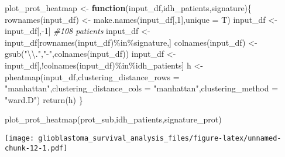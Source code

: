 \documentclass[
]{article}
\newenvironment{Shaded}{\begin{snugshade}}{\end{snugshade}}
\newcommand{\AttributeTok}[1]{\textcolor[rgb]{0.77,0.63,0.00}{#1}}
\newcommand{\CommentTok}[1]{\textcolor[rgb]{0.56,0.35,0.01}{\textit{#1}}}
\newcommand{\ControlFlowTok}[1]{\textcolor[rgb]{0.13,0.29,0.53}{\textbf{#1}}}
\newcommand{\DecValTok}[1]{\textcolor[rgb]{0.00,0.00,0.81}{#1}}
\newcommand{\FunctionTok}[1]{\textcolor[rgb]{0.00,0.00,0.00}{#1}}
\newcommand{\NormalTok}[1]{#1}
\newcommand{\OtherTok}[1]{\textcolor[rgb]{0.56,0.35,0.01}{#1}}
\newcommand{\SpecialCharTok}[1]{\textcolor[rgb]{0.00,0.00,0.00}{#1}}
\newcommand{\StringTok}[1]{\textcolor[rgb]{0.31,0.60,0.02}{#1}}
\begin{document}
\begin{Shaded}
\begin{Highlighting}[]
\NormalTok{plot\_prot\_heatmap }\OtherTok{\textless{}{-}} \ControlFlowTok{function}\NormalTok{(input\_df,idh\_patients,signature)\{}
  \FunctionTok{rownames}\NormalTok{(input\_df) }\OtherTok{\textless{}{-}} \FunctionTok{make.names}\NormalTok{(input\_df[,}\DecValTok{1}\NormalTok{],}\AttributeTok{unique =}\NormalTok{ T)}
\NormalTok{  input\_df }\OtherTok{\textless{}{-}}\NormalTok{ input\_df[,}\SpecialCharTok{{-}}\DecValTok{1}\NormalTok{] }\CommentTok{\#108 patients}
\NormalTok{  input\_df }\OtherTok{\textless{}{-}}\NormalTok{ input\_df[}\FunctionTok{rownames}\NormalTok{(input\_df)}\SpecialCharTok{\%in\%}\NormalTok{signature,]}
  \FunctionTok{colnames}\NormalTok{(input\_df) }\OtherTok{\textless{}{-}} \FunctionTok{gsub}\NormalTok{(}\StringTok{"}\SpecialCharTok{\textbackslash{}\textbackslash{}}\StringTok{."}\NormalTok{,}\StringTok{"{-}"}\NormalTok{,}\FunctionTok{colnames}\NormalTok{(input\_df))}
\NormalTok{  input\_df }\OtherTok{\textless{}{-}}\NormalTok{ input\_df[,}\SpecialCharTok{!}\FunctionTok{colnames}\NormalTok{(input\_df)}\SpecialCharTok{\%in\%}\NormalTok{idh\_patients]}
\NormalTok{  h }\OtherTok{\textless{}{-}} \FunctionTok{pheatmap}\NormalTok{(input\_df,}\AttributeTok{clustering\_distance\_rows =} \StringTok{"manhattan"}\NormalTok{,}\AttributeTok{clustering\_distance\_cols  =} \StringTok{"manhattan"}\NormalTok{,}\AttributeTok{clustering\_method =} \StringTok{"ward.D"}\NormalTok{)}
  \FunctionTok{return}\NormalTok{(h)}
\NormalTok{\}}
\end{Highlighting}
\end{Shaded}

\begin{Shaded}
\begin{Highlighting}[]
\FunctionTok{plot\_prot\_heatmap}\NormalTok{(prot\_sub,idh\_patients,signature\_prot)}
\end{Highlighting}
\end{Shaded}

\texttt{[image: glioblastoma\_survival\_analysis\_files/figure-latex/unnamed-chunk-12-1.pdf]}
\end{document}
